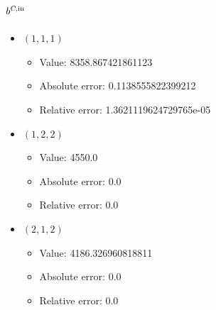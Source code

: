 \documentclass{article}%
\begin{document}
\subsection{$b^{\textsl{C},\text{in}}$}%
\begin{itemize}%
	\item $(1, 1, 1)$%
	\begin{itemize}%
		\item Value: 8358.867421861123%
		\item Absolute error: 0.1138555822399212%
		\item Relative error: 1.3621119624729765e-05%
	\end{itemize}%
	\item $(1, 2, 2)$%
	\begin{itemize}%
		\item Value: 4550.0%
		\item Absolute error: 0.0%
		\item Relative error: 0.0%
	\end{itemize}%
	\item $(2, 1, 2)$%
	\begin{itemize}%
		\item Value: 4186.326960818811%
		\item Absolute error: 0.0%
		\item Relative error: 0.0%
	\end{itemize}%
\end{itemize}%
\end{document}
